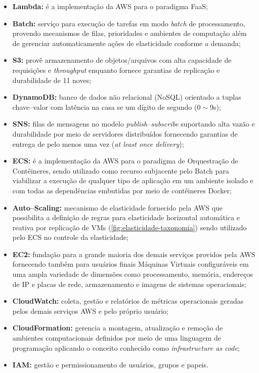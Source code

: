 \documentclass[english,brazilian]{UNISINOSmonografia} %
\begin{document}
\begin{itemize}
	
	\item \textbf{Lambda:} é a implementação da AWS para o paradigma FaaS;
	
	\item \textbf{Batch:} serviço para execução de tarefas em modo \textit{batch} de processamento, provendo mecanismos de filas, prioridades e ambientes de computação além de gerenciar automaticamente ações de elasticidade conforme a demanda;
	
	\item \textbf{S3:} provê armazenamento de objetos/arquivos com alta capacidade de requisições e \textit{throughput} enquanto fornece garantias de replicação e durabilidade de 11 noves;
	
	\item \textbf{DynamoDB:} banco de dados não relacional (NoSQL) orientado a tuplas chave--valor com latência na casa se um dígito de segundo ($0\sim9$s);
	
	\item \textbf{SNS:} filas de mensagens no modelo \textit{publish--subscribe} suportando alta vazão e durabilidade por meio de servidores distribuídos fornecendo garantias de entrega de pelo menos uma vez (\textit{at least once delivery});
	
	\item \textbf{ECS:} é a implementação da AWS para o paradigma de Orquestração de Contêineres, sendo utilizado como recurso subjacente pelo Batch para viabilizar a execução de qualquer tipo de aplicação em um ambiente isolado e com todas as dependências embutidas por meio de contêineres Docker;
	
	\item \textbf{Auto--Scaling:} mecanismo de elasticidade fornecido pela AWS que possibilita a definição de regras para elasticidade horizontal automática e reativa por replicação de VMs (\autoref{fig:elasticidade-taxonomia}) sendo utilizado pelo ECS no controle da elasticidade;
	
	\item \textbf{EC2:} fundação para a grande maioria dos demais serviços providos pela AWS fornecendo também para usuários finais Máquinas Virtuais configuráveis em uma ampla variedade de dimensões como processamento, memória, endereços de IP e placas de rede, armazenamento e imagens de sistemas operacionais;
	
	\item \textbf{CloudWatch:} coleta, gestão e relatórios de métricas operacionais geradas pelos demais serviços AWS e pelo próprio usuário;
	
	\item \textbf{CloudFormation:} gerencia a montagem, atualização e remoção de ambientes computacionais definidos por meio de uma linguagem de programação aplicando o conceito conhecido como \textit{infrastructure as code};
	
	\item \textbf{IAM:} gestão e permissionamento de usuários, grupos e papeis.
	
\end{itemize}
\end{document}
